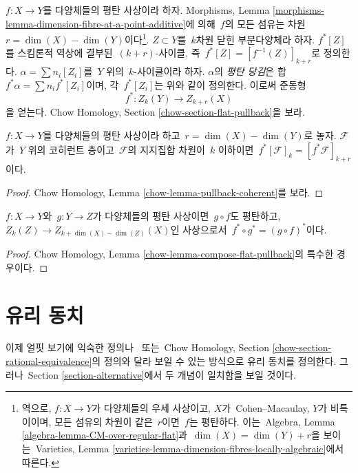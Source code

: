 \noindent
$f : X \to Y$를 다양체들의 평탄 사상이라 하자.
Morphisms, Lemma
\ref{morphisms-lemma-dimension-fibre-at-a-point-additive}에 의해\ 
$f$의 모든 섬유는 차원\  $r = \dim(X) - \dim(Y)$이다\footnote{역으로,
$f : X \to Y$가 다양체들의 우세 사상이고, $X$가\  Cohen--Macaulay,
$Y$가 비특이이며, 모든 섬유의 차원이 같은\  $r$이면\  $f$는 평탄하다.
이는\  Algebra, Lemma \ref{algebra-lemma-CM-over-regular-flat}과\ 
$\dim(X) = \dim(Y) + r$을 보이는\ 
Varieties, Lemma \ref{varieties-lemma-dimension-fibres-locally-algebraic}에서
따른다.}.
$Z \subset Y$를\  $k$차원 닫힌 부분다양체라 하자. $f^*[Z]$를
스킴론적 역상에 결부된\  $(k + r)$-사이클, 즉\ 
$f^*[Z] = [f^{-1}(Z)]_{k + r}$로 정의한다.
$\alpha = \sum n_i [Z_i]$를\  $Y$ 위의\  $k$-사이클이라 하자.
$\alpha$의 {\it 평탄 당김}은 합\  $f^* \alpha = \sum n_i f^*[Z_i]$이며,
각\  $f^*[Z_i]$는 위와 같이 정의한다. 이로써 준동형
$$
f^* : Z_k(Y) \longrightarrow Z_{k + r}(X)
$$
을 얻는다. Chow Homology, Section
\ref{chow-section-flat-pullback}을 보라.

\begin{lemma}
\label{lemma-pullback}
$f : X \to Y$를 다양체들의 평탄 사상이라 하고\ 
$r = \dim(X) - \dim(Y)$로 놓자. $\mathcal{F}$가\  $Y$ 위의 코히런트
층이고\  $\mathcal{F}$의 지지집합 차원이\  $k$ 이하이면\ 
$f^*[\mathcal{F}]_k = [f^*\mathcal{F}]_{k + r}$이다.
\end{lemma}

\begin{proof}
Chow Homology, Lemma \ref{chow-lemma-pullback-coherent}를 보라.
\end{proof}

\begin{lemma}
\label{lemma-compose-flat-pullback}
$f : X \to Y$와\  $g : Y \to Z$가 다양체들의 평탄 사상이면\ 
$g \circ f$도 평탄하고,
$Z_k(Z) \to Z_{k + \dim(X) - \dim(Z)}(X)$인 사상으로서\ 
$f^* \circ g^* = (g \circ f)^*$이다.
\end{lemma}

\begin{proof}
Chow Homology, Lemma \ref{chow-lemma-compose-flat-pullback}의 특수한 경우이다.
\end{proof}


\section{유리 동치}
\label{section-rational-equivalence}

\noindent
이제 얼핏 보기에 익숙한 정의나\  \cite[Chapter I]{F} 또는\ 
Chow Homology, Section \ref{chow-section-rational-equivalence}의 정의와
달라 보일 수 있는 방식으로 유리 동치를 정의한다. 그러나\ 
Section \ref{section-alternative}에서 두 개념이 일치함을 보일 것이다.


